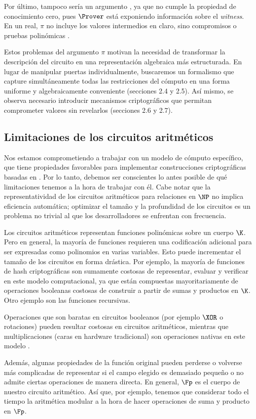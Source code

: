 Por último, tampoco sería un argumento \ZK, ya que no cumple la propiedad de conocimiento cero, pues $\Prover$ está exponiendo información sobre el \textit{witness}. En un \SNARK real, $\pi$ no incluye los valores intermedios en claro, sino compromisos o pruebas polinómicas \cite{Parno2016}.

Estos problemas del argumento $\pi$ motivan la necesidad de transformar la descripción del circuito en una representación algebraica más estructurada. En lugar de manipular puertas individualmente, buscaremos un formalismo que capture simultáneamente todas las restricciones del cómputo en una forma uniforme y algebraicamente conveniente (secciones 2.4 y 2.5). Así mismo, se observa necesario introducir mecanismos criptográficos que permitan comprometer valores sin revelarlos (secciones 2.6 y 2.7).

\subsection{Limitaciones de los circuitos aritméticos}

Nos estamos comprometiendo a trabajar con un modelo de cómputo específico, que tiene propiedades favorables para implementar construcciones criptográficas basadas en \SNARK. Por lo tanto, debemos ser conscientes lo antes posible de qué limitaciones tenemos a la hora de trabajar con él. Cabe notar que la representatividad de los circuitos aritméticos para relaciones en $\NP$ no implica eficiencia automática; optimizar el tamaño y la profundidad de los circuitos es un problema no trivial al que los desarrolladores se enfrentan con frecuencia.

Los circuitos aritméticos representan funciones polinómicas sobre un cuerpo $\K$. Pero en general, la mayoría de funciones requieren una codificación adicional para ser expresadas como polinomios en varias variables. Esto puede incrementar el tamaño de los circuitos en forma drástica. Por ejemplo, la mayoría de funciones de hash criptográficas son sumamente costosas de representar, evaluar y verificar en este modelo computacional, ya que están compuestas mayoritariamente de operaciones booleanas costosas de construir a partir de sumas y productos en $\K$. Otro ejemplo son las funciones recursivas.

Operaciones que son baratas en circuitos booleanos (por ejemplo $\XOR$ o rotaciones) pueden resultar costosas en circuitos aritméticos, mientras que multiplicaciones (caras en hardware tradicional) son operaciones nativas en este modelo \cite{vonzurGathen1991}.

Además, algunas propiedades de la función original pueden perderse o volverse más complicadas de representar si el campo elegido es demasiado pequeño o no admite ciertas operaciones de manera directa. En general, $\Fp$  es el cuerpo de nuestro circuito aritmético. Así que, por ejemplo, tenemos que considerar todo el tiempo la aritmética modular a la hora de hacer operaciones de suma y producto en $\Fp$.
